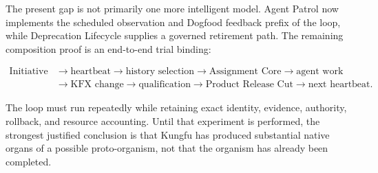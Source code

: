 The present gap is not primarily one more intelligent model. Agent Patrol now
implements the scheduled observation and Dogfood feedback prefix of the loop,
while Deprecation Lifecycle supplies a governed retirement path. The remaining
composition proof is an end-to-end trial binding:

\[
\begin{aligned}
\text{Initiative} &\rightarrow
\text{heartbeat} \rightarrow
\text{history selection} \rightarrow
\text{Assignment Core} \rightarrow
\text{agent work} \\
&\rightarrow
\text{KFX change} \rightarrow
\text{qualification} \rightarrow
\text{Product Release Cut} \rightarrow
\text{next heartbeat}.
\end{aligned}
\]

The loop must run repeatedly while retaining exact identity, evidence,
authority, rollback, and resource accounting. Until that experiment is
performed, the strongest justified conclusion is that Kungfu has produced
substantial native organs of a possible proto-organism, not that the organism
has already been completed.
